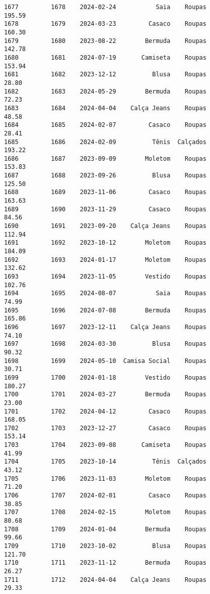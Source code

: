 \documentclass[11pt]{article}
\begin{document}
\begin{Verbatim}[commandchars=\\\{\}]
1677         1678    2024-02-24           Saia    Roupas          195.59   
1678         1679    2024-03-23         Casaco    Roupas          160.30   
1679         1680    2023-08-22        Bermuda    Roupas          142.78   
1680         1681    2024-07-19       Camiseta    Roupas          153.94   
1681         1682    2023-12-12          Blusa    Roupas           28.80   
1682         1683    2024-05-29        Bermuda    Roupas           72.23   
1683         1684    2024-04-04    Calça Jeans    Roupas           48.58   
1684         1685    2024-02-07         Casaco    Roupas           28.41   
1685         1686    2024-02-09          Tênis  Calçados          193.22   
1686         1687    2023-09-09        Moletom    Roupas          153.83   
1687         1688    2023-09-26          Blusa    Roupas          125.50   
1688         1689    2023-11-06         Casaco    Roupas          163.63   
1689         1690    2023-11-29         Casaco    Roupas           84.56   
1690         1691    2023-09-20    Calça Jeans    Roupas          112.94   
1691         1692    2023-10-12        Moletom    Roupas          184.09   
1692         1693    2024-01-17        Moletom    Roupas          132.62   
1693         1694    2023-11-05        Vestido    Roupas          102.76   
1694         1695    2024-08-07           Saia    Roupas           74.99   
1695         1696    2024-07-08        Bermuda    Roupas          165.86   
1696         1697    2023-12-11    Calça Jeans    Roupas           74.10   
1697         1698    2024-03-30          Blusa    Roupas           90.32   
1698         1699    2024-05-10  Camisa Social    Roupas           30.71   
1699         1700    2024-01-18        Vestido    Roupas          180.27   
1700         1701    2024-03-27        Bermuda    Roupas           23.00   
1701         1702    2024-04-12         Casaco    Roupas          168.05   
1702         1703    2023-12-27         Casaco    Roupas          153.14   
1703         1704    2023-09-08       Camiseta    Roupas           41.99   
1704         1705    2023-10-14          Tênis  Calçados           43.12   
1705         1706    2023-11-03        Moletom    Roupas           71.20   
1706         1707    2024-02-01         Casaco    Roupas           38.85   
1707         1708    2024-02-15        Moletom    Roupas           80.68   
1708         1709    2024-01-04        Bermuda    Roupas           99.66   
1709         1710    2023-10-02          Blusa    Roupas          121.70   
1710         1711    2023-11-12        Bermuda    Roupas           26.27   
1711         1712    2024-04-04    Calça Jeans    Roupas           29.33   

\end{Verbatim}
\end{document}
